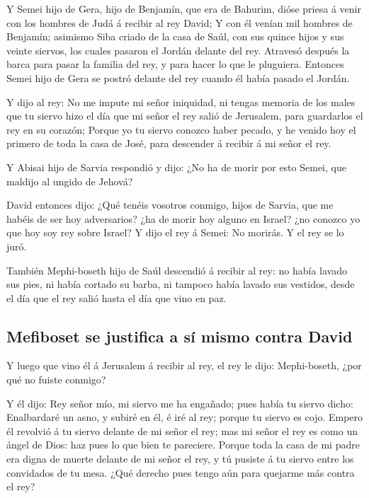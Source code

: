  Y Semei hijo de Gera, hijo de Benjamín, que era de
Bahurim, dióse priesa á venir con los hombres de Judá á recibir al rey
David;  Y con él venían mil hombres de Benjamín; asimismo
Siba criado de la casa de Saúl, con sus quince hijos y sus veinte
siervos, los cuales pasaron el Jordán delante del rey. 
Atravesó después la barca para pasar la familia del rey, y para hacer lo
que le pluguiera. Entonces Semei hijo de Gera se postró delante del rey
cuando él había pasado el Jordán.

 Y dijo al rey: No me impute mi señor iniquidad, ni tengas
memoria de los males que tu siervo hizo el día que mi señor el rey salió
de Jerusalem, para guardarlos el rey en su corazón;  Porque
yo tu siervo conozco haber pecado, y he venido hoy el primero de toda la
casa de José, para descender á recibir á mi señor el rey.

 Y Abisai hijo de Sarvia respondió y dijo: ¿No ha de morir
por esto Semei, que maldijo al ungido de Jehová?

 David entonces dijo: ¿Qué tenéis vosotros conmigo, hijos
de Sarvia, que me habéis de ser hoy adversarios? ¿ha de morir hoy alguno
en Israel? ¿no conozco yo que hoy soy rey sobre Israel?  Y
dijo el rey á Semei: No morirás. Y el rey se lo juró.

 También Mephi-boseth hijo de Saúl descendió á recibir al
rey: no había lavado sus pies, ni había cortado su barba, ni tampoco
había lavado sus vestidos, desde el día que el rey salió hasta el día
que vino en paz.

\hypertarget{mefiboset-se-justifica-a-suxed-mismo-contra-david}{%
\subsection{Mefiboset se justifica a sí mismo contra
David}\label{mefiboset-se-justifica-a-suxed-mismo-contra-david}}

 Y luego que vino él á Jerusalem á recibir al rey, el rey
le dijo: Mephi-boseth, ¿por qué no fuiste conmigo?

 Y él dijo: Rey señor mío, mi siervo me ha engañado; pues
había tu siervo dicho: Enalbardaré un asno, y subiré en él, é iré al
rey; porque tu siervo es cojo.  Empero él revolvió á tu
siervo delante de mi señor el rey; mas mi señor el rey es como un ángel
de Dios: haz pues lo que bien te pareciere.  Porque toda la
casa de mi padre era digna de muerte delante de mi señor el rey, y tú
pusiste á tu siervo entre los convidados de tu mesa. ¿Qué derecho pues
tengo aún para quejarme más contra el rey?

